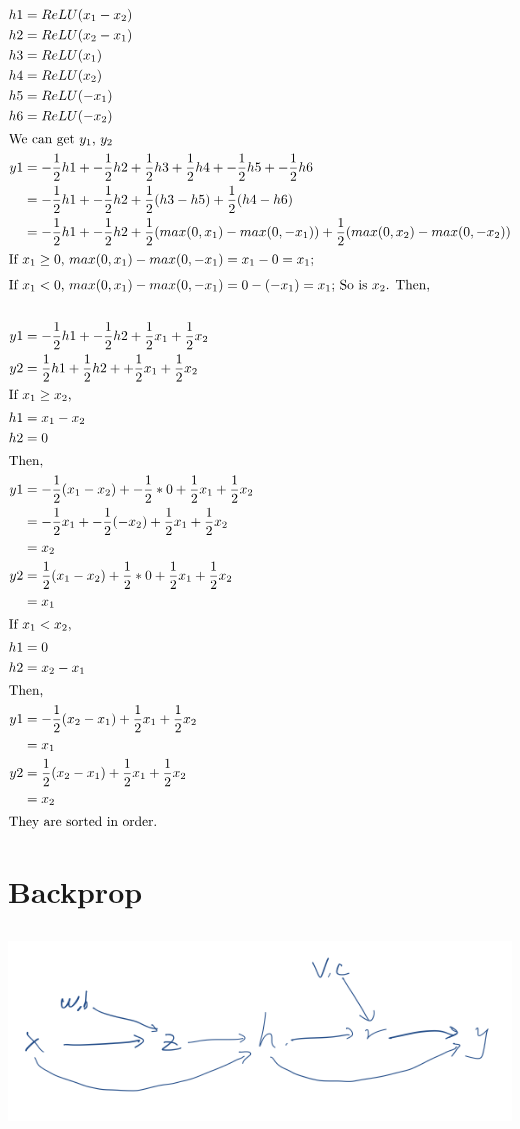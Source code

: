 \documentclass{article}
\begin{document}
\begin{align*}
h1&=ReLU(x_1-x_2)\\
h2&=ReLU(x_2-x_1)\\
h3&=ReLU(x_1)\\
h4&=ReLU(x_2)\\
h5&=ReLU(-x_1)\\
h6&=ReLU(-x_2)\\
\intertext{We can get $y_1$, $y_2$}
y1&=-\frac{1}{2}h1 + -\frac{1}{2}h2 + \frac{1}{2}h3 + \frac{1}{2}h4 + -\frac{1}{2}h5 + -\frac{1}{2}h6\\
&=-\frac{1}{2}h1 + -\frac{1}{2}h2 + \frac{1}{2}(h3-h5) + \frac{1}{2}(h4-h6)\\
&=-\frac{1}{2}h1 + -\frac{1}{2}h2 + \frac{1}{2}(max(0,x_1)-max(0,-x_1)) + \frac{1}{2}(max(0,x_2)-max(0,-x_2))\\
\intertext{If $x_1 \geq 0$, $max(0,x_1)-max(0,-x_1)=x_1-0=x_1$;}
\intertext{If $x_1 < 0$, $max(0,x_1)-max(0,-x_1)=0-(-x_1)=x_1$; So is $x_2$. Then,}\\
y1&=-\frac{1}{2}h1 + -\frac{1}{2}h2 + \frac{1}{2}x_1+\frac{1}{2}x_2\\
y2&=\frac{1}{2}h1 + \frac{1}{2}h2 + + \frac{1}{2}x_1+\frac{1}{2}x_2\\
\intertext{If $x_1 \geq x_2$,}
h1&=x_1-x_2\\
h2&=0\\
\intertext{Then,}
y1&=-\frac{1}{2}(x_1-x_2) + -\frac{1}{2}*0 + \frac{1}{2}x_1+\frac{1}{2}x_2\\
&=-\frac{1}{2}x_1+ -\frac{1}{2}(-x_2) + \frac{1}{2}x_1+\frac{1}{2}x_2\\
&=x_2\\
y2&=\frac{1}{2}(x_1-x_2) + \frac{1}{2}*0 + \frac{1}{2}x_1+\frac{1}{2}x_2\\
&=x_1\\
\intertext{If $x_1 < x_2$,}
h1&=0\\
h2&=x_2-x_1\\
\intertext{Then,}
y1&=-\frac{1}{2}(x_2-x_1) + \frac{1}{2}x_1+\frac{1}{2}x_2\\
&=x_1\\
y2&=\frac{1}{2}(x_2-x_1) + \frac{1}{2}x_1+\frac{1}{2}x_2\\
&=x_2\\
\intertext{They are sorted in order.}
\end{align*}
\section{Backprop}
\subsection{}
\includegraphics[width=\textwidth,height=\textheight,keepaspectratio]{cg.png}
\end{document}
